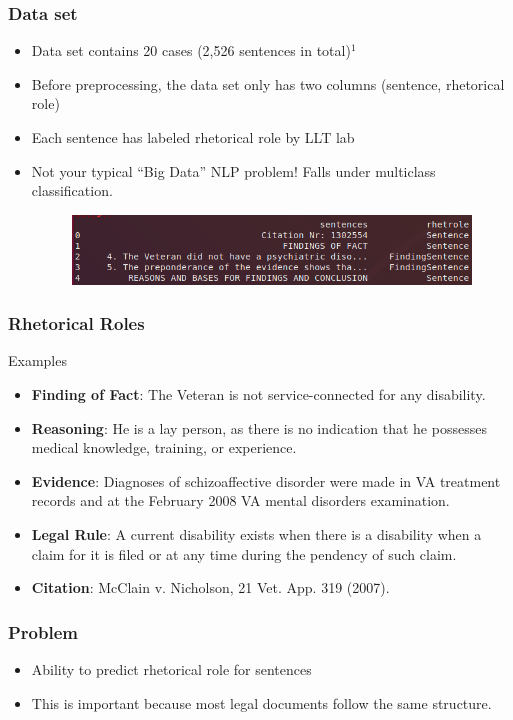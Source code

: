 \documentclass{beamer}
\begin{document}
\begin{frame}
  \frametitle{Data set}
  \begin{itemize}
  \item Data set contains 20 cases (2,526 sentences in total)$^1$
  \item Before preprocessing, the data set only has two columns (sentence, rhetorical role)
  \item Each sentence has labeled rhetorical role by LLT lab
  \item Not your typical ``Big Data'' NLP problem! Falls under multiclass classification.
    \begin{figure}
      \includegraphics[width=1\linewidth]{sample_data.png}
    \end{figure}
  \end{itemize}
\end{frame}


\begin{frame}
  \frametitle{Rhetorical Roles}
  \footnotesize
  Examples
  \begin{itemize}
  \item \textbf{Finding of Fact}: The Veteran is not service-connected for any disability.
  \item \textbf{Reasoning}: He is a lay person, as there is no indication that he possesses medical knowledge, training, or experience.
  \item \textbf{Evidence}: Diagnoses of schizoaffective disorder were made in VA treatment records and at the February 2008 VA mental disorders examination.
  \item \textbf{Legal Rule}: A current disability exists when there is a disability when a claim for it is filed or at any time during the pendency of such claim.
  \item \textbf{Citation}: McClain v. Nicholson, 21 Vet. App. 319 (2007).
  \end{itemize}
\end{frame}

\begin{frame}
  \frametitle{Problem}
  \begin{itemize}
    \item Ability to predict rhetorical role for sentences
    \item This is important because most legal documents follow the same structure.
    \end{itemize}
  \end{frame}
  
\end{document}
